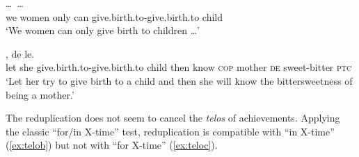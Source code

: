 
\ex\label{ex:sheng}%
\gll {}  \ldots\,    \ldots \\
we women {} only can give.birth.to-give.birth.to child\\
\glt `We women can only give birth to children \ldots'

\ex\label{ex:redup-achi-stat5}
\gll {}   ,     de  le.\\
let she give.birth.to-give.birth.to child then know \textsc{cop} mother \textsc{de} sweet-bitter \textsc{ptc}\\ 
\glt `Let her try to give birth to a child and then she will know the bittersweetness of being a mother.'
\z
\z

The reduplication does not seem to cancel the \textit{telos} of achievements.
Applying the classic ``for/in X-time'' test, reduplication is compatible with ``in X-time'' (\ref{ex:telob}) but not with ``for X-time'' (\ref{ex:teloc}).
\ea
{}


